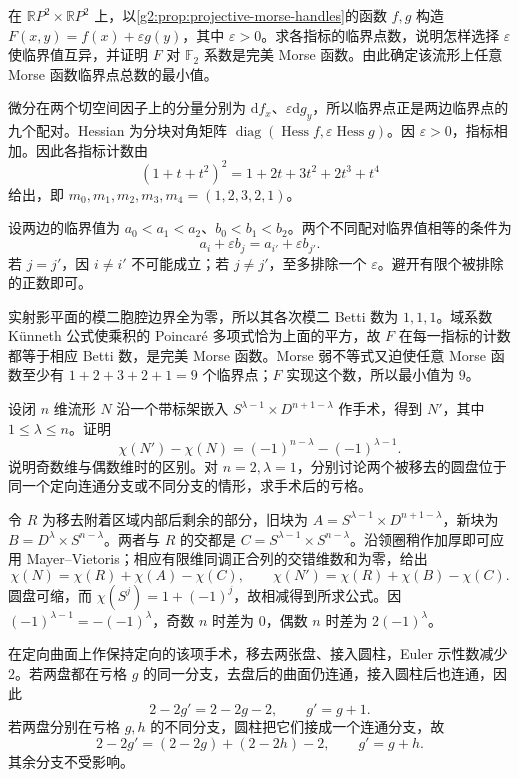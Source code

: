 \begin{exercise}\label{g2:ex:product-projective-morse}
	在 \(\mathbb RP^2\times\mathbb RP^2\) 上，以\cref{g2:prop:projective-morse-handles}的函数 \(f,g\) 构造 \(F(x,y)=f(x)+\varepsilon g(y)\)，其中 \(\varepsilon>0\)。求各指标的临界点数，说明怎样选择 \(\varepsilon\) 使临界值互异，并证明 \(F\) 对 \(\mathbb F_2\) 系数是完美 Morse 函数。由此确定该流形上任意 Morse 函数临界点总数的最小值。
\end{exercise}
\begin{solution}
	微分在两个切空间因子上的分量分别为 \(\mathrm df_x\)、\(\varepsilon\mathrm dg_y\)，所以临界点正是两边临界点的九个配对。Hessian 为分块对角矩阵 \(\operatorname{diag}(\operatorname{Hess}f,\varepsilon\operatorname{Hess}g)\)。因 \(\varepsilon>0\)，指标相加。因此各指标计数由
	\[
		(1+t+t^2)^2=1+2t+3t^2+2t^3+t^4
	\]
	给出，即 \(m_0,m_1,m_2,m_3,m_4=(1,2,3,2,1)\)。

	设两边的临界值为 \(a_0<a_1<a_2\)、\(b_0<b_1<b_2\)。两个不同配对临界值相等的条件为
	\[
		a_i+\varepsilon b_j=a_{i'}+\varepsilon b_{j'}.
	\]
	若 \(j=j'\)，因 \(i\ne i'\) 不可能成立；若 \(j\ne j'\)，至多排除一个 \(\varepsilon\)。避开有限个被排除的正数即可。

	实射影平面的模二胞腔边界全为零，所以其各次模二 Betti 数为 \(1,1,1\)。域系数 Künneth 公式使乘积的 Poincaré 多项式恰为上面的平方，故 \(F\) 在每一指标的计数都等于相应 Betti 数，是完美 Morse 函数。Morse 弱不等式又迫使任意 Morse 函数至少有 \(1+2+3+2+1=9\) 个临界点；\(F\) 实现这个数，所以最小值为 \(9\)。
\end{solution}

\begin{exercise}\label{g2:ex:surgery-euler-change}
	设闭 \(n\) 维流形 \(N\) 沿一个带标架嵌入 \(S^{\lambda-1}\times D^{n+1-\lambda}\) 作手术，得到 \(N'\)，其中 \(1\le\lambda\le n\)。证明
	\[
		\chi(N')-\chi(N)=(-1)^{n-\lambda}-(-1)^{\lambda-1}.
	\]
	说明奇数维与偶数维时的区别。对 \(n=2,\lambda=1\)，分别讨论两个被移去的圆盘位于同一个定向连通分支或不同分支的情形，求手术后的亏格。
\end{exercise}
\begin{solution}
	令 \(R\) 为移去附着区域内部后剩余的部分，旧块为 \(A=S^{\lambda-1}\times D^{n+1-\lambda}\)，新块为 \(B=D^\lambda\times S^{n-\lambda}\)。两者与 \(R\) 的交都是 \(C=S^{\lambda-1}\times S^{n-\lambda}\)。沿领圈稍作加厚即可应用 Mayer--Vietoris；相应有限维同调正合列的交错维数和为零，给出
	\[
		\chi(N)=\chi(R)+\chi(A)-\chi(C),\qquad
		\chi(N')=\chi(R)+\chi(B)-\chi(C).
	\]
	圆盘可缩，而 \(\chi(S^j)=1+(-1)^j\)，故相减得到所求公式。因 \((-1)^{\lambda-1}=-(-1)^\lambda\)，奇数 \(n\) 时差为 \(0\)，偶数 \(n\) 时差为 \(2(-1)^\lambda\)。

	在定向曲面上作保持定向的该项手术，移去两张盘、接入圆柱，Euler 示性数减少 \(2\)。若两盘都在亏格 \(g\) 的同一分支，去盘后的曲面仍连通，接入圆柱后也连通，因此
	\[
		2-2g'=2-2g-2,\qquad g'=g+1.
	\]
	若两盘分别在亏格 \(g,h\) 的不同分支，圆柱把它们接成一个连通分支，故
	\[
		2-2g'=(2-2g)+(2-2h)-2,\qquad g'=g+h.
	\]
	其余分支不受影响。
\end{solution}

